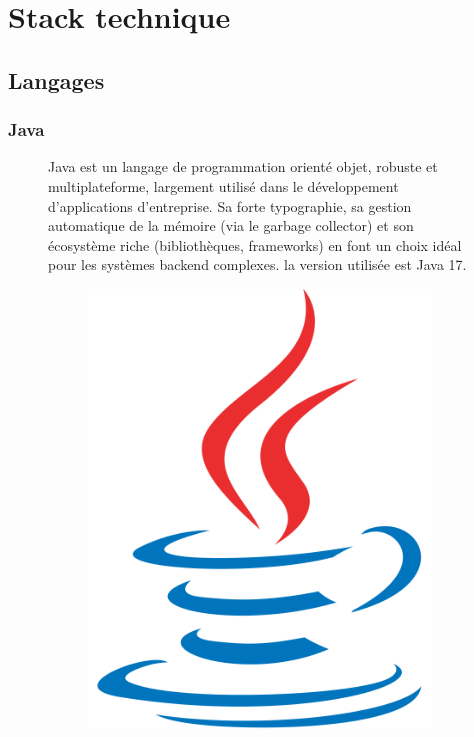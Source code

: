 \documentclass[12pt,a4paper]{report}
\begin{document}
	\section{Stack technique}
	
	\subsection{Langages}
	
	\subsubsection{Java}
	
	\begin{figure}[H]
		\begin{minipage}{0.8\textwidth}
			Java est un langage de programmation orienté objet, robuste et multiplateforme, largement utilisé dans le développement d'applications d'entreprise. Sa forte typographie, sa gestion automatique de la mémoire (via le garbage collector) et son écosystème riche (bibliothèques, frameworks) en font un choix idéal pour les systèmes backend complexes. la version utilisée est Java 17.
		\end{minipage}
		\hfill
		\begin{minipage}{0.15\textwidth}
			\begin{figure}[H]
				\centering
				\includegraphics[width=\linewidth]{java-logo.png}
				\label{fig:java-logo}
			\end{figure}			
		\end{minipage}
	\end{figure}
	
\end{document}
